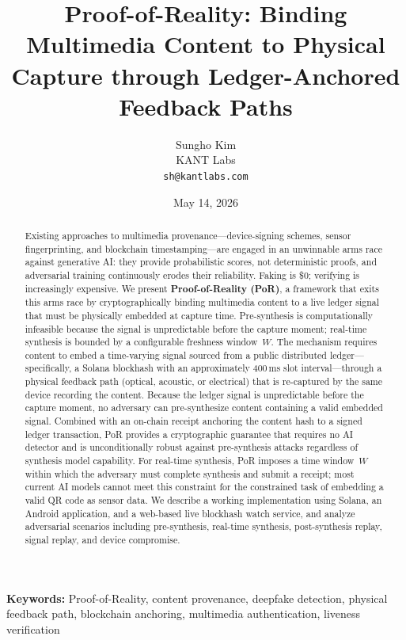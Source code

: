 \documentclass[11pt]{article}
\title{\textbf{Proof-of-Reality: Binding Multimedia Content to Physical\\
Capture through Ledger-Anchored Feedback Paths}}
\author{
  Sungho Kim\\
  KANT Labs\\
  \texttt{sh@kantlabs.com}
}
\date{May 14, 2026}
\begin{document}
\maketitle

\begin{abstract}
Existing approaches to multimedia provenance---device-signing schemes, sensor
fingerprinting, and blockchain timestamping---are engaged in an unwinnable arms
race against generative AI: they provide probabilistic scores, not
deterministic proofs, and adversarial training continuously erodes their
reliability. Faking is \$0; verifying is increasingly expensive. We present
\textbf{Proof-of-Reality (PoR)}, a framework that exits this arms race by cryptographically binding multimedia
content to a live ledger signal that must be physically embedded at capture
time. Pre-synthesis is computationally infeasible because the signal is
unpredictable before the capture moment; real-time synthesis is bounded by a
configurable freshness window~$W$. The mechanism requires
content to embed a time-varying signal sourced from a public distributed
ledger---specifically, a Solana blockhash with an approximately 400\,ms slot
interval---through a physical feedback path (optical, acoustic, or electrical)
that is re-captured by the same device recording the content. Because the
ledger signal is unpredictable before the capture moment, no adversary can
pre-synthesize content containing a valid embedded signal. Combined with an
on-chain receipt anchoring the content hash to a signed ledger transaction,
PoR provides a cryptographic guarantee that requires no AI detector and is
unconditionally robust against pre-synthesis attacks regardless of synthesis
model capability. For real-time synthesis, PoR imposes a time window~$W$
within which the adversary must complete synthesis and submit a receipt; most
current AI models cannot meet this constraint for the constrained task of
embedding a valid QR code as sensor data. We describe a working
implementation using Solana, an Android application, and a
web-based live blockhash watch service, and analyze adversarial scenarios including
pre-synthesis, real-time synthesis, post-synthesis replay, signal replay, and
device compromise.
\end{abstract}

\smallskip
\noindent\textbf{Keywords:} Proof-of-Reality, content provenance, deepfake detection, physical
feedback path, blockchain anchoring, multimedia authentication, liveness
verification

\clearpage
\tableofcontents
\clearpage
\end{document}
